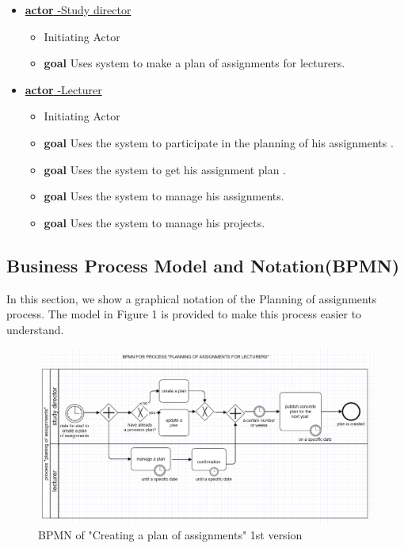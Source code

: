 \documentclass{scrartcl}
\begin{document}
  \begin{itemize}
  \item \underline{\textbf {actor} -Study director}
	
  		\begin{itemize}
  			\item Initiating Actor
  			\item \textbf{goal} Uses  system to make a plan of assignments for lecturers. 
  			
  		\end{itemize}
  	
 \item \underline{\textbf {actor} -Lecturer} 
		\begin{itemize}
		\item Initiating Actor
		\item  \textbf{goal }Uses the system to participate in the planning of  his assignments .
		    \item  \textbf{goal }Uses the system to get his assignment plan .
		    \item \textbf{goal} Uses the system to manage his assignments.
  			\item \textbf{goal }Uses the system to  manage his projects.
  	
\end{itemize}    	


 
\end{itemize}   

 \subsection{Business Process Model and Notation(BPMN)}
 In this section, we show a graphical notation of the Planning of assignments process. The model in Figure 1 is provided to make this process easier to understand. 
 
 \begin{figure}[h]
\centering
\includegraphics[width=150mm]{uml/bpmn.JPG}
\caption{BPMN of "Creating a plan of assignments" 1st version}
\label{blabla}
\end{figure}
\end{document}
